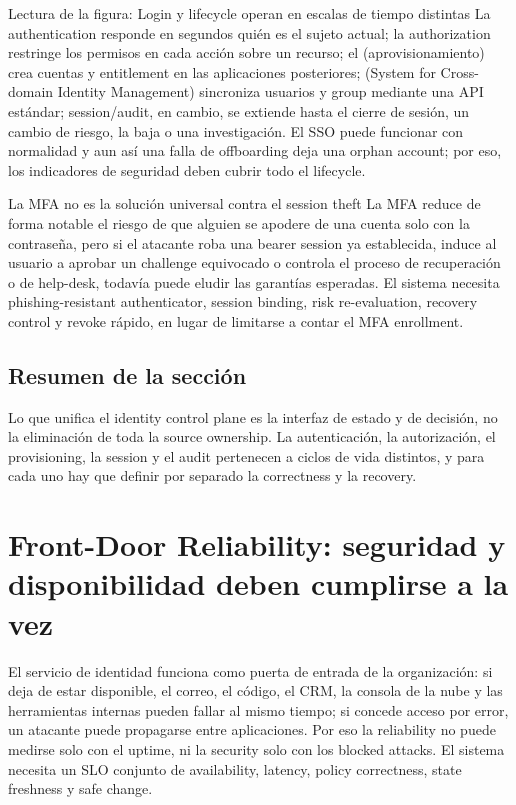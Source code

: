 \documentclass[a4paper]{article}
\begin{document}
\begin{knowledgebox}{Lectura de la figura: Login y lifecycle operan en escalas de tiempo distintas}
La authentication responde en segundos quién es el sujeto actual; la authorization restringe los permisos en cada acción sobre un recurso; el  (aprovisionamiento) crea cuentas y entitlement en las aplicaciones posteriores;  (System for Cross-domain Identity Management) sincroniza usuarios y group mediante una API estándar; session/audit, en cambio, se extiende hasta el cierre de sesión, un cambio de riesgo, la baja o una investigación. El SSO puede funcionar con normalidad y aun así una falla de offboarding deja una orphan account; por eso, los indicadores de seguridad deben cubrir todo el lifecycle.
\end{knowledgebox}

\begin{warningbox}{La MFA no es la solución universal contra el session theft}
La MFA reduce de forma notable el riesgo de que alguien se apodere de una cuenta solo con la contraseña, pero si el atacante roba una bearer session ya establecida, induce al usuario a aprobar un challenge equivocado o controla el proceso de recuperación o de help-desk, todavía puede eludir las garantías esperadas. El sistema necesita phishing-resistant authenticator, session binding, risk re-evaluation, recovery control y revoke rápido, en lugar de limitarse a contar el MFA enrollment.
\end{warningbox}

\subsection{Resumen de la sección}

Lo que unifica el identity control plane es la interfaz de estado y de decisión, no la eliminación de toda la source ownership. La autenticación, la autorización, el provisioning, la session y el audit pertenecen a ciclos de vida distintos, y para cada uno hay que definir por separado la correctness y la recovery.
\section{Front-Door Reliability: seguridad y disponibilidad deben cumplirse a la vez}

El servicio de identidad funciona como puerta de entrada de la organización: si deja de estar disponible, el correo, el código, el CRM, la consola de la nube y las herramientas internas pueden fallar al mismo tiempo; si concede acceso por error, un atacante puede propagarse entre aplicaciones. Por eso la reliability no puede medirse solo con el uptime, ni la security solo con los blocked attacks. El sistema necesita un SLO conjunto de availability, latency, policy correctness, state freshness y safe change.
\end{document}
